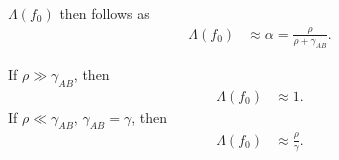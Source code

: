 \documentclass[11pt]{article}
\begin{document}
$\Lambda(f_0)$ then follows as
\begin{align}\label{eq:lambda_strong_s_neutral}
    \Lambda(f_0) &\approx \alpha = \frac{\rho}{\rho + \gamma_{AB}}.
\end{align}

If $\rho \gg \gamma_{AB}$, then 
\begin{align}
    \Lambda(f_0) &\approx 1.
\end{align}
If $\rho \ll \gamma_{AB}$, $\gamma_{AB} = \gamma$, then
\begin{align}
    \Lambda(f_0) &\approx \frac{\rho}{\gamma}.
\end{align} 



\end{document}
